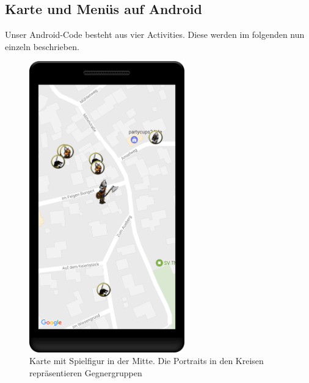 \documentclass[extern,palatino]{cgBA}
\begin{document}
\subsection{Karte und Menüs auf Android}
Unser Android-Code besteht aus vier Activities. Diese werden im folgenden nun einzeln beschrieben.
\begin{figure}[H] 
	\centering
	\includegraphics[width=0.6\textwidth]{map.png}
	\caption{Karte mit Spielfigur in der Mitte. Die Portraits in den Kreisen repräsentieren Gegnergruppen}
	\label{map}
\end{figure}
\end{document}
